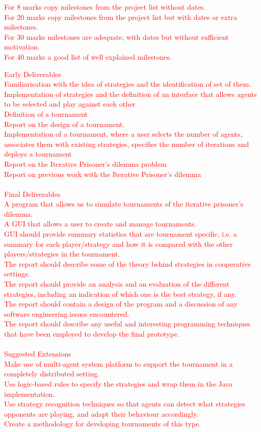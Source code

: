 \documentclass{article}
\begin{document}
\textcolor{red}{For 8 marks copy milestones from the project list without dates.\\For 20 marks copy milestones from the project list but with dates or extra milestones.\\For 30 marks milestones are adequate, with dates but without sufficient motivation.\\For 40 marks a good list of well explained milestones.}

\textcolor{red}{\noindent Early Deliverables\\
Familiarisation with the idea of strategies and the identification of set of them.\\
Implementation of strategies and the definition of an interface that allows agents to be selected and play against each other\\
Definition of a tournament\\
Report on the design of a tournament.\\
Implementation of a tournament, where a user selects the number of agents, associates them with existing strategies, specifies the number of iterations and deploys a tournament\\
Report on the Iterative Prisoner's dilemma problem\\
Report on previous work with the Iterative Prisoner's dilemma\\\\
 Final Deliverables\\
A program that allows us to simulate tournaments of the iterative prisoner's dilemma.\\
A GUI that allows a user to create and manage tournaments.\\
GUI should provide summary statistics that are tournament specific, i.e. a summary for each player/strategy and how it is compared with the other players/strategies in the tournament.\\
The report should describe some of the theory behind strategies in cooperative settings.\\
The report should provide an analysis and an evaluation of the different strategies, including an indication of which one is the best strategy, if any.\\
The report should contain a design of the program and a discussion of any software engineering issues encountered.\\
The report should describe any useful and interesting programming techniques that have been employed to develop the final prototype.\\\\
Suggested Extensions\\
Make use of multi-agent system platform to support the tournament in a completely distributed setting.\\
Use logic-based rules to specify the strategies and wrap them in the Java implementation.\\
Use strategy recognition techniques so that agents can detect what strategies opponents are playing, and adapt their behaviour accordingly.\\
Create a methodology for developing tournaments of this type.\\}
\end{document}

